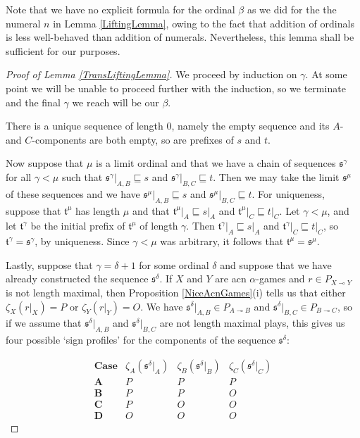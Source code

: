 \documentclass[11pt]{article} %
\theoremstyle{plain} %
\theoremstyle{definition} %
\theoremstyle{note}
\theoremstyle{exercisestyle}
\renewcommand{\implies}{\multimap}
\newcommand{\s}{\mathfrak s}
\renewcommand{\t}{\mathfrak t}
\newcommand{\prefix}{\sqsubseteq}
\begin{document}
Note that we have no explicit formula for the ordinal $\beta$ as we did for the the numeral $n$ in Lemma \ref{LiftingLemma}, owing to the fact that addition of ordinals is less well-behaved than addition of numerals.  Nevertheless, this lemma shall be sufficient for our purposes.  

\begin{proof}[Proof of Lemma \ref{TransLiftingLemma}]
  We proceed by induction on $\gamma$.  At some point we will be unable to proceed further with the induction, so we terminate and the final $\gamma$ we reach will be our $\beta$.  

  There is a unique sequence of length $0$, namely the empty sequence and its $A$- and $C$-components are both empty, so are prefixes of $s$ and $t$.  

  Now suppose that $\mu$ is a limit ordinal and that we have a chain of sequences $\s^\gamma$ for all $\gamma<\mu$ such that $\s^\gamma\vert_{A,B}\prefix s$ and $\s^\gamma\vert_{B,C}\prefix t$.  Then we may take the limit $\s^\mu$ of these sequences and we have $\s^\mu\vert_{A,B}\prefix s$ and $\s^\mu\vert_{B,C}\prefix t$.  For uniqueness, suppose that $\t^\mu$ has length $\mu$ and that $\t^\mu\vert_A\prefix s\vert_A$ and $\t^\mu\vert_C\prefix t\vert_C$.  Let $\gamma<\mu$, and let $\t^\gamma$ be the initial prefix of $\t^\mu$ of length $\gamma$.  Then $\t^\gamma\vert_A\prefix s\vert_A$ and $\t^\gamma\vert_C\prefix t\vert_C$, so $\t^\gamma=\s^\gamma$, by uniqueness.  Since $\gamma<\mu$ was arbitrary, it follows that $\t^\mu=\s^\mu$.  

  Lastly, suppose that $\gamma=\delta+1$ for some ordinal $\delta$ and suppose that we have already constructed the sequence $\s^\delta$.  If $X$ and $Y$ are acn $\alpha$-games and $r\in P_{X\implies Y}$ is not length maximal, then Proposition \ref{NiceAcnGames}(i) tells us that either $\zeta_X(r\vert_X)=P$ or $\zeta_Y(r\vert_Y)=O$.  We have $\s^\delta\vert_{A,B}\in P_{A\implies B}$ and $\s^\delta\vert_{B,C}\in P_{B\implies C}$, so if we assume that $\s^\delta\vert_{A,B}$ and $\s^\delta\vert_{B,C}$ are not length maximal plays, this gives us four possible `sign profiles' for the components of the sequence $\s^\delta$:

  \[
    \begin{array}{c|ccc}
      \textbf{Case} & \zeta_A(\s^\delta\vert_A) & \zeta_B(\s^\delta\vert_B) & \zeta_C(\s^\delta\vert_C) \\
      \hline
      \textbf{A} & P & P & P \\
      \textbf{B} & P & P & O \\
      \textbf{C} & P & O & O \\
      \textbf{D} & O & O & O
    \end{array}
    \]


\end{proof}
\end{document}
